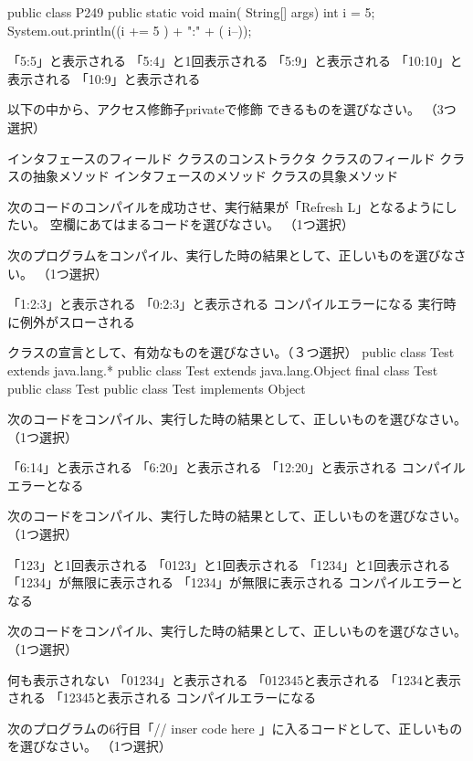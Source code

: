 \documentclass{jarticle}
\begin{document}
public  class P249 {
    public  static void main( String[] args){
        int i = 5;
        System.out.println((i += 5 ) + ":" + ( i--));
    }
}

「5:5」と表示される
「5:4」と1回表示される
「5:9」と表示される
「10:10」と表示される
「10:9」と表示される

以下の中から、アクセス修飾子privateで修飾
できるものを選びなさい。
（3つ選択）

インタフェースのフィールド
クラスのコンストラクタ
クラスのフィールド
クラスの抽象メソッド
インタフェースのメソッド
クラスの具象メソッド

次のコードのコンパイルを成功させ、実行結果が「Refresh L」となるようにしたい。
空欄にあてはまるコードを選びなさい。
（1つ選択）





次のプログラムをコンパイル、実行した時の結果として、正しいものを選びなさい。
（1つ選択）


「1:2:3」と表示される
「0:2:3」と表示される
コンパイルエラーになる
実行時に例外がスローされる

クラスの宣言として、有効なものを選びなさい。（３つ選択）
public class Test extends java.lang.* { }
public class Test extends java.lang.Object{}
final class Test{}
public class Test{}
public class Test implements Object{}

次のコードをコンパイル、実行した時の結果として、正しいものを選びなさい。
（1つ選択）


「6:14」と表示される
「6:20」と表示される
「12:20」と表示される
コンパイルエラーとなる


次のコードをコンパイル、実行した時の結果として、正しいものを選びなさい。（1つ選択）

「123」と1回表示される
「0123」と1回表示される
「1234」と1回表示される
「1234」が無限に表示される
「1234」が無限に表示される
コンパイルエラーとなる


次のコードをコンパイル、実行した時の結果として、正しいものを選びなさい。（1つ選択）


何も表示されない
「01234」と表示される
「012345と表示される
「1234と表示される
「12345と表示される
コンパイルエラーになる


次のプログラムの6行目「// inser code here 」に入るコードとして、正しいものを選びなさい。
（1つ選択）
\end{document}
